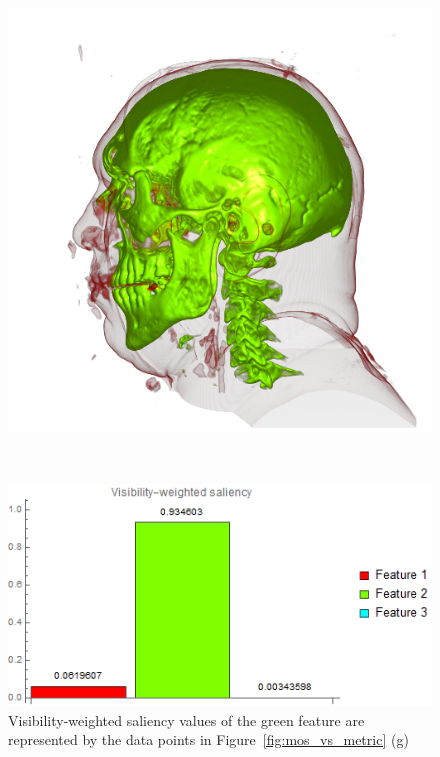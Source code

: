 \begin{figure}
\begin{minipage}{.24\textwidth}
		\includegraphics[width=1\linewidth]{images/vismale_strong_green}
		\subcaption{}
	\end{minipage}~
	\begin{minipage}{.25\textwidth}
		\includegraphics[width=1\linewidth]{images/vismale_strong_green_visibility_saliency_weighted_chart}
		\subcaption{}
	\end{minipage}
	\caption{Visibility-weighted saliency values of the green feature are represented by the data points in Figure~\ref{fig:mos_vs_metric} (g)}
	\label{fig:vismale_feature2_charts}
\end{figure}

